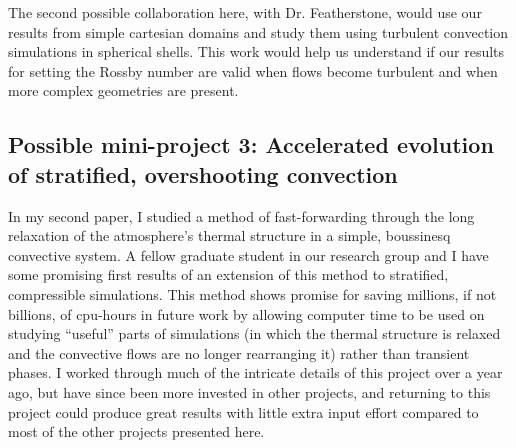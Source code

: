 \documentclass[aasms,12pt]{article}
\begin{document}
The second possible collaboration here, with Dr. Featherstone, would use our results from
simple cartesian domains and study them using turbulent convection simulations in spherical shells. 
This work would help us understand if our results for setting the Rossby number are valid when
flows become turbulent and when more complex geometries are present.

\subsection{Possible mini-project 3: Accelerated evolution of stratified, overshooting convection}
In my second paper, I studied a method of fast-forwarding through the long relaxation of the
atmosphere's thermal structure in a simple, boussinesq convective system. A fellow graduate student
in our research group and I have some promising first results of an extension of this method
to stratified, compressible simulations. This method shows promise for saving millions, if
not billions, of cpu-hours in future work by allowing computer time to be used on studying
``useful'' parts of simulations (in which the thermal structure is relaxed and the convective
flows are no longer rearranging it) rather than transient phases. I worked through much of the
intricate details of this project over a year ago, but have since been more invested in other
projects, and returning to this project could produce great results with little extra input
effort compared to most of the other projects presented here.
\end{document}
